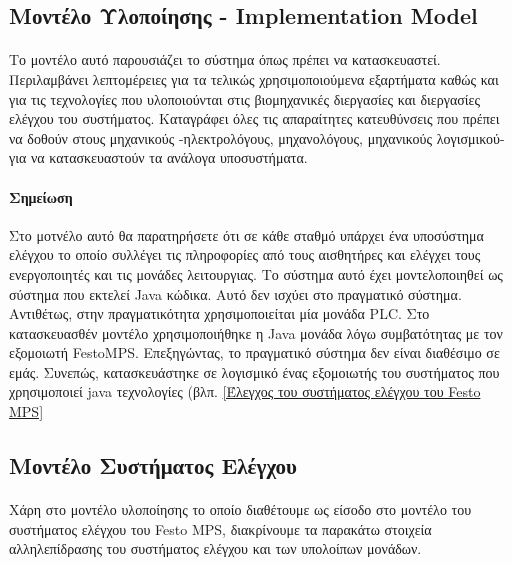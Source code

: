 \documentclass[a4paper,12pt,twoside]{report}
\begin{document}
			\subsection{Μοντέλο Υλοποίησης - Implementation Model}
			
				\paragraph{} {Το μοντέλο αυτό παρουσιάζει το σύστημα όπως πρέπει να κατασκευαστεί. Περιλαμβάνει λεπτομέρειες για τα τελικώς χρησιμοποιούμενα εξαρτήματα καθώς και για τις τεχνολογίες που υλοποιούνται στις βιομηχανικές διεργασίες και διεργασίες ελέγχου του συστήματος. Καταγράφει όλες τις απαραίτητες κατευθύνσεις που πρέπει να δοθούν στους μηχανικούς -ηλεκτρολόγους, μηχανολόγους, μηχανικούς λογισμικού- για να κατασκευαστούν τα ανάλογα υποσυστήματα.
				}
				
				\paragraph{Σημείωση} {Στο μοτνέλο αυτό θα παρατηρήσετε ότι σε κάθε σταθμό υπάρχει ένα υποσύστημα ελέγχου το οποίο συλλέγει τις πληροφορίες από τους αισθητήρες και ελέγχει τους ενεργοποιητές και τις μονάδες λειτουργιας. Το σύστημα αυτό έχει μοντελοποιηθεί ως σύστημα που εκτελεί Java κώδικα. Αυτό δεν ισχύει στο πραγματικό σύστημα. Αντιθέτως, στην πραγματικότητα χρησιμοποιείται μία μονάδα PLC. Στο κατασκευασθέν μοντέλο χρησιμοποιήθηκε η Java μονάδα λόγω συμβατότητας με τον εξομοιωτή FestoMPS. Επεξηγώντας, το πραγματικό σύστημα δεν είναι διαθέσιμο σε εμάς. Συνεπώς, κατασκευάστηκε σε λογισμικό ένας εξομοιωτής του συστήματος που χρησιμοποιεί java τεχνολογίες {\footnotesize (βλπ. \ref{Έλεγχος του συστήματος ελέγχου του Festo MPS}}
				}
				
			\subsection{Μοντέλο Συστήματος Ελέγχου}
			
				\paragraph{} {Χάρη στο μοντέλο υλοποίησης το οποίο διαθέτουμε ως είσοδο στο μοντέλο του συστήματος ελέγχου του Festo MPS\textregistered, διακρίνουμε τα παρακάτω στοιχεία αλληλεπίδρασης του συστήματος ελέγχου και των υπολοίπων μονάδων.
				}
				
\end{document}
